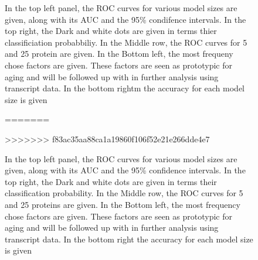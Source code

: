 \documentclass[a4paper,11pt,twoside]{book}
\begin{document}
	
	\begin{figure}[htb!]
		\vspace*{-2cm}
		\caption[Random Forest Classifier for Young and Old Mice]{In the top left panel, the ROC curves for various model sizes are given, along with its AUC and the 95\% condifence intervals. In the top right, the Dark and white dots are given in terms thier classificiation probabbiliy. In the Middle row, the ROC curves for 5 and 25 protein are given. In the Bottom left, the most frequeny chose factors are given. These factors are seen as prototypic for aging and will be followed up with in further analysis using transcript data. In the bottom rightm the accuracy for each model size is given}
		\label{fig:proteomicsvingetterandomforestage}
=======
        \caption[Random Forest Classifier for Young and Old Mice]{In the top left panel, the ROC curves for various model sizes are given, along with its AUC and the 95\% confidence intervals. In the top right, the Dark and white dots are given in terms their classification probability. In the Middle row, the ROC curves for 5 and 25 proteins are given. In the Bottom left, the most frequency chose factors are given. These factors are seen as prototypic for aging and will be followed up with in further analysis using transcript data. In the bottom right the accuracy for each model size is given} 
        \label{fig:proteomicsvingetterandomforestage} 
>>>>>>> f83ac35aa88ca1a19860f106f52e21e266dde4e7
	\end{figure}
	
\end{document}
